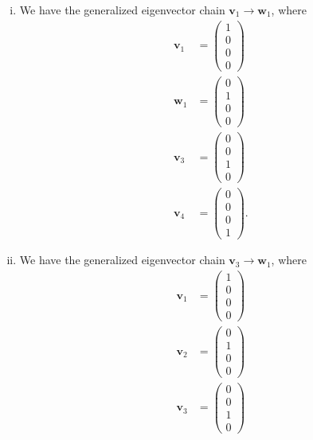 \documentclass[10pt]{mypackage}
\begin{document}
\begin{solution}\hfill
  \begin{enumerate}[(i)]
    \item We have the generalized eigenvector chain $\mathbf{v}_1 \rightarrow \mathbf{w}_1$, where
      \begin{align*}
        \mathbf{v}_1 &= \begin{pmatrix}1\\0\\0\\0\end{pmatrix}\\
        \mathbf{w}_1 &= \begin{pmatrix}0\\1\\0\\0\end{pmatrix}\\
        \mathbf{v}_3 &= \begin{pmatrix}0\\0\\1\\0\end{pmatrix}\\
        \mathbf{v}_4 &= \begin{pmatrix}0\\0\\0\\1\end{pmatrix}.
      \end{align*}
    \item We have the generalized eigenvector chain $\mathbf{v}_3 \rightarrow \mathbf{w}_1$, where
      \begin{align*}
        \mathbf{v}_1 &= \begin{pmatrix}1\\0\\0\\0\end{pmatrix}\\
        \mathbf{v}_2 &= \begin{pmatrix}0\\1\\0\\0\end{pmatrix}\\
        \mathbf{v}_3 &= \begin{pmatrix}0\\0\\1\\0\end{pmatrix}\\

\end{align*}
\end{enumerate}
\end{solution}
\end{document}
